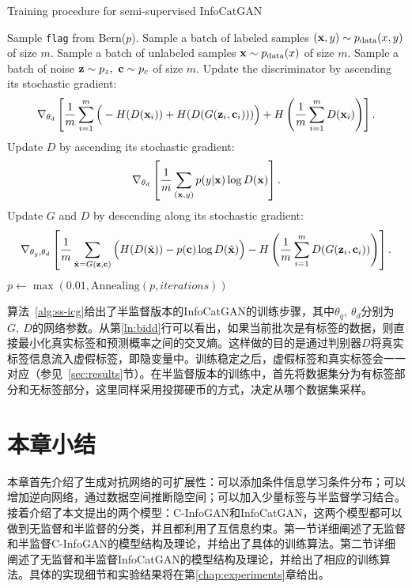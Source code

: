 \begin{algorithm}[htbp]
  \small
  \caption{Training procedure for semi-supervised InfoCatGAN}
  \label{alg:ss-icg}
  \begin{algorithmic}[1]
      \State Sample \texttt{flag} from Bern($p$).
        \State Sample a batch of labeled samples 
        $(\mathbf{x}, y) \sim p_{\text{data}}(x,y)$ of size $m$.
      \Else
        \State Sample a batch of unlabeled samples 
        $\mathbf{x} \sim p_{\text{data}}(x)$ of size $m$.
      \EndIf
      \State Sample a batch of noise $\mathbf{z}\sim p_z, ~\mathbf{c}\sim p_c$ of size
      $m$.
      \State Update the discriminator by ascending its stochastic gradient:
      \label{ln:catdss}
      \[
        \nabla_{\theta_d} \left[ 
          \frac{1}{m} \sum_{i=1}^m \Big( 
            - H(D(\mathbf{x}_i)) + H(D(G(\mathbf{z}_i, \mathbf{c}_i)))
          \Big) + H\left( \frac{1}{m}\sum_{i=1}^m D(\mathbf{x}_i) \right)
        \right].
      \]
        \State Update $D$ by ascending its stochastic gradient:
        \label{ln:bidd}
        \[
          \nabla_{\theta_d} \left[ 
            \frac{1}{m} \sum_{(\mathbf{x}, y)} p(y|\mathbf{x}) \log D(\bf{x}) 
          \right].
        \]
      \EndIf
      \State Update $G$ and $D$ by descending along its stochastic gradient:
      \label{ln:catgss}
      \[
        \nabla_{\theta_g,\theta_d} \left[ 
          \frac{1}{m} \sum_{\tilde{\mathbf{x}} = G(\mathbf{z},\mathbf{c})} \Big(
            H(D(\tilde{\mathbf{x}})) - p(\mathbf{c})\log D(\tilde{\mathbf{x}})
          \Big)
          - H \left( 
            \frac{1}{m}\sum_{i=1}^m D(G(\mathbf{z}_i, \mathbf{c}_i))
          \right)
        \right].
      \]
      \State $p \gets \max(0.01, \text{Annealing}(p, iterations))$ 
    \EndFor
  \end{algorithmic}
\end{algorithm}
算法~\ref{alg:ss-icg}给出了半监督版本的InfoCatGAN的训练步骤，其中$\theta_q,~\theta_d$分别为$G,~D$的网络参数。从第\ref{ln:bidd}行可以看出，如果当前批次是有标签的数据，则直接最小化真实标签和预测概率之间的交叉熵。这样做的目的是通过判别器$D$将真实标签信息流入虚假标签，即隐变量中。训练稳定之后，虚假标签和真实标签会一一对应（参见~\ref{sec:results}节）。在半监督版本的训练中，首先将数据集分为有标签部分和无标签部分，这里同样采用投掷硬币的方式，决定从哪个数据集采样。

\section{本章小结}
本章首先介绍了生成对抗网络的可扩展性：可以添加条件信息学习条件分布；可以增加逆向网络，通过数据空间推断隐空间；可以加入少量标签与半监督学习结合。接着介绍了本文提出的两个模型：C-InfoGAN和InfoCatGAN，这两个模型都可以做到无监督和半监督的分类，并且都利用了互信息约束。第一节详细阐述了无监督和半监督C-InfoGAN的模型结构及理论，并给出了具体的训练算法。第二节详细阐述了无监督和半监督InfoCatGAN的模型结构及理论，并给出了相应的训练算法。具体的实现细节和实验结果将在第\ref{chap:experiments}章给出。
